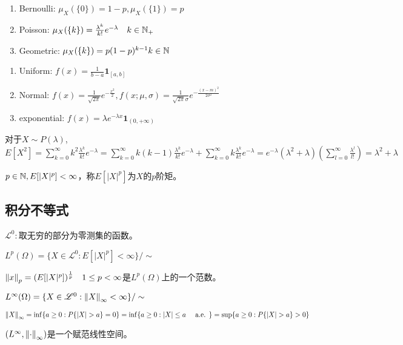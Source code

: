 \documentclass{ctexbook}
\begin{document}
\begin{Eg}
  \begin{enumerate}
  \item Bernoulli: $\mu_{X}(\{0\})=1-p,\mu_{X}(\{1\})=p$
  \item Poisson: $\mu_{X}(\{k\})=\frac{\lambda^{k}}{k!}e^{-\lambda}\quad k\in\mathbb{N}_{+}$
  \item Geometric: $\mu_{X}(\{k\})=p(1-p)^{k-1} k\in\mathbb{N}$
  \end{enumerate}

  \begin{enumerate}
  \item Uniform: $f(x)=\frac{1}{b-a}\bm 1_{[a,b]}$
  \item Normal: $f(x)=\frac{1}{\sqrt{2\pi}}e^{-\frac{x^{2}}{2}},f(x;\mu,\sigma)=\frac{1}{\sqrt{2\pi}\sigma}e^{-\frac{(x-m)^{2}}{2\sigma^{2}}}$
  \item exponential: $f(x)=\lambda e^{-\lambda x}\bm 1_{(0,+\infty)}$
  \end{enumerate}
\end{Eg}

\begin{Eg}
  对于$X\sim P(\lambda)$, $E[X^{2}]=\sum_{k=0}^{\infty}k^{2}\frac{\lambda^{k}}{k!}e^{-\lambda}=\sum_{k=0}^{\infty}k(k-1)\frac{\lambda^{k}}{k!}e^{-\lambda}+\sum_{k=0}^{\infty}k\frac{\lambda^{k}}{k!}e^{-\lambda}=e^{-\lambda}(\lambda^{2}+\lambda)(\sum_{l=0}^{\infty}\frac{\lambda^{l}}{l!})=\lambda^{2}+\lambda$
\end{Eg}

\begin{Def}[矩，moment]
  $p\in \mathbb{N}, E[|X|^{p}]<\infty$，称$E[|X|^{p}]$为$X$的$p$阶矩。
\end{Def}

\subsection{积分不等式}
$\mathscr{L}^{0}:$取无穷的部分为零测集的函数。

\begin{Def}
  $L^{p}(\Omega)=\{X\in \mathscr{L}^{0}:E[|X|^{p}]<\infty\}/\sim$

  $\left\|x\right\|_{p}=(E[|X|^{p}])^{\frac 1 p}\quad 1\leq p<\infty$是$L^{p}(\Omega)$上的一个范数。

  $L^{\infty}(\Omega)=\{X\in\mathscr{L}^{0}:\left\|X\right\|_{\infty}<\infty\}/\sim$

  $\nm{X}_{\infty}=\inf\{a\geq 0:P\{|X|>a\}=0\}=\inf\{a\geq 0: |X|\leq a\quad\alev\}=\sup\{a\geq 0: P\{|X|>a\}>0\}$

  $(L^{\infty},\left\|\cdot\right\|_{\infty})$是一个赋范线性空间。
\end{Def}
\end{document}
